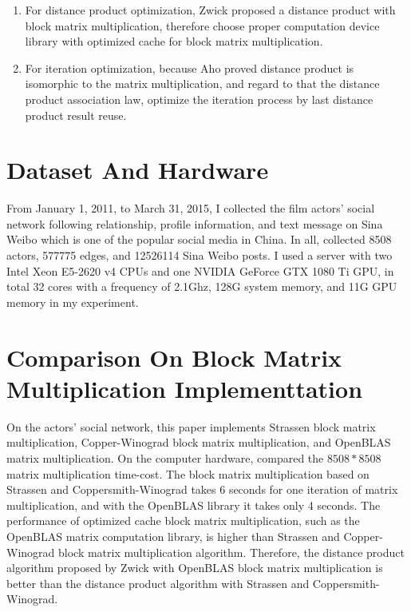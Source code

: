 \documentclass[review]{cvpr}
\begin{document}
\begin{enumerate}
\item For distance product optimization, Zwick proposed a distance product with block matrix multiplication, therefore choose proper computation device library with optimized cache for block matrix multiplication.
\item For iteration optimization, because Aho proved distance product is isomorphic to the matrix multiplication, and regard to that the distance product association law, optimize the iteration process by last distance product result reuse.
\end{enumerate}


\section{Dataset And Hardware}
From January 1, 2011, to March 31, 2015, I collected the film actors' social network following relationship, profile information, and text message on Sina Weibo which is one of the popular social media in China.
In all, collected 8508 actors, 577775 edges, and 12526114 Sina Weibo posts.
I used a server with two Intel Xeon E5-2620 v4 CPUs and one NVIDIA GeForce GTX 1080 Ti GPU, in total 32 cores with a frequency of 2.1Ghz, 128G system memory, and 11G GPU memory in my experiment.



\section{Comparison On Block Matrix Multiplication Implementtation}

On the actors' social network, this paper implements Strassen block matrix multiplication, Copper-Winograd block matrix multiplication, and OpenBLAS matrix multiplication.
On the computer hardware, compared the $8508*8508$ matrix multiplication time-cost.
The block matrix multiplication based on Strassen and Coppersmith-Winograd takes 6 seconds for one iteration of matrix multiplication, and with the OpenBLAS library it takes only 4 seconds.
The performance of optimized cache block matrix multiplication, such as the OpenBLAS matrix computation library, is higher than Strassen and Copper-Winograd block matrix multiplication algorithm.
Therefore, the distance product algorithm proposed by Zwick with OpenBLAS block matrix multiplication is better than the distance product algorithm with Strassen and Coppersmith-Winograd.
\end{document}
